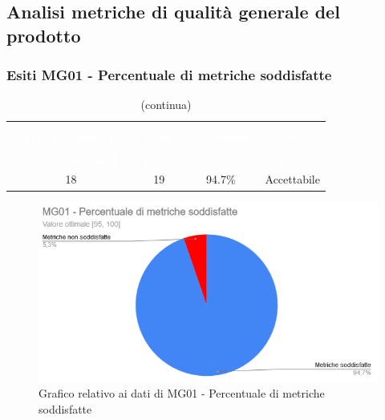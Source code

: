 \subsection{Analisi metriche di qualità generale del prodotto}
\subsubsection{Esiti MG01 - Percentuale di metriche soddisfatte}
\begin{longtable}{c c c c}
\rowcolor{white}\caption{Esiti MG01 - PMS}\\
		\rowcolor{redafk}
\textcolor{white}{\textbf{Metriche soddisfatte}} & \textcolor{white}{\textbf{Totale}} & 
\textcolor{white}{\textbf{Percentuale}} & \textcolor{white}{\textbf{Esito}}\\
		\endfirsthead
		\rowcolor{white}\caption[]{(continua)} \\
		\rowcolor{redafk}
\textcolor{white}{\textbf{Metriche Soddisfatte}} & \textcolor{white}{\textbf{Totale}} & 
\textcolor{white}{\textbf{Percentuale}} & \textcolor{white}{\textbf{Esito}}\\
		\endhead
		18 & 19 & 94.7\% & Accettabile\\
\end{longtable}

\begin{figure}[H]
\centering
\includegraphics[scale=0.7]{./img/MG01.png}
\caption{Grafico relativo ai dati di MG01 - Percentuale di metriche soddisfatte}
\end{figure}

